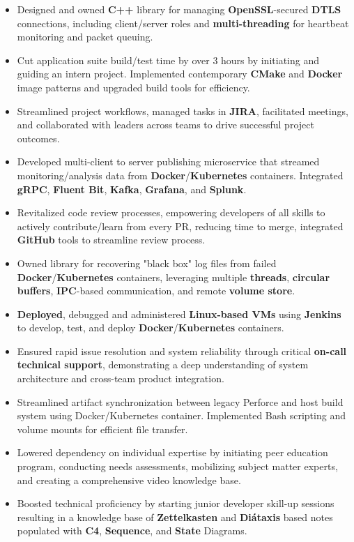 \documentclass[a4paper]{article}
\begin{document}
\begin{itemize}
	\item Designed and owned \textbf{C++} library for managing \textbf{OpenSSL}-secured \textbf{DTLS} connections, including client/server roles and \textbf{multi-threading} for heartbeat monitoring and packet queuing.
	\item Cut application suite build/test time by over 3 hours by initiating and guiding an intern project. Implemented contemporary \textbf{CMake} and \textbf{Docker} image patterns and upgraded build tools for efficiency.
	\item Streamlined project workflows, managed tasks in \textbf{JIRA}, facilitated meetings, and collaborated with leaders across teams to drive successful project outcomes.
	\item Developed multi-client to server publishing microservice that streamed monitoring/analysis data from \textbf{Docker}/\textbf{Kubernetes} containers. Integrated \textbf{gRPC}, \textbf{Fluent Bit}, \textbf{Kafka}, \textbf{Grafana}, and \textbf{Splunk}.
	\item Revitalized code review processes, empowering developers of all skills to actively contribute/learn from every PR, reducing time to merge, integrated \textbf{GitHub} tools to streamline review process.
	\item Owned library for recovering "black box" log files from failed \textbf{Docker}/\textbf{Kubernetes} containers, leveraging multiple \textbf{threads}, \textbf{circular buffers}, \textbf{IPC}-based communication, and remote \textbf{volume store}.
	\item \textbf{Deployed}, debugged and administered \textbf{Linux-based VMs} using \textbf{Jenkins} to develop, test, and deploy \textbf{Docker}/\textbf{Kubernetes} containers.
	\item Ensured rapid issue resolution and system reliability through critical \textbf{on-call technical support}, demonstrating a deep understanding of system architecture and cross-team product integration.
	\item Streamlined artifact synchronization between legacy Perforce and host build system using Docker/Kubernetes container. Implemented Bash scripting and volume mounts for efficient file transfer.
	\item Lowered dependency on individual expertise by initiating peer education program, conducting needs assessments, mobilizing subject matter experts, and creating a comprehensive video knowledge base.
	\item Boosted technical proficiency by starting junior developer skill-up sessions resulting in a knowledge base of \textbf{Zettelkasten} and \textbf{Diátaxis} based notes populated with \textbf{C4}, \textbf{Sequence}, and \textbf{State} Diagrams.

\end{itemize}
\end{document}
